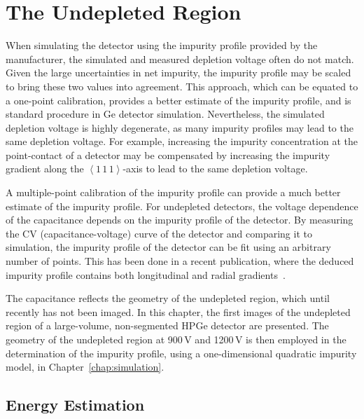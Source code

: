 \chapter{The Undepleted Region}\label{chap:bubble}

When simulating the detector using the impurity profile provided by the manufacturer, the simulated and measured depletion voltage often do not match. Given the large uncertainties in net impurity, the impurity profile may be scaled to bring these two values into agreement. This approach, which can be equated to a one-point calibration, provides a better estimate of the impurity profile, and is standard procedure in Ge detector simulation. Nevertheless, the simulated depletion voltage is highly degenerate, as many impurity profiles may lead to the same depletion voltage. For example, increasing the impurity concentration at the point-contact of a detector may be compensated by increasing the impurity gradient along the $\left<1\,1\,1\right>$-axis to lead to the same depletion voltage. 

A multiple-point calibration of the impurity profile can provide a much better estimate of the impurity profile. For undepleted detectors, the voltage dependence of the capacitance depends on the impurity profile of the detector. By measuring the CV (capacitance-voltage) curve of the detector and comparing it to simulation, the impurity profile of the detector can be fit using an arbitrary number of points. This has been done in a recent publication, where the deduced impurity profile contains both longitudinal and radial gradients~\cite{cv_impurities}.

The capacitance reflects the geometry of the undepleted region, which until recently has not been imaged. In this chapter, the first images of the undepleted region of a large-volume, non-segmented HPGe detector are presented. The geometry of the undepleted region at 900\,V and 1200\,V is then employed in the determination of the impurity profile, using a one-dimensional quadratic impurity model, in Chapter~\ref{chap:simulation}. 

\section{Energy Estimation}

